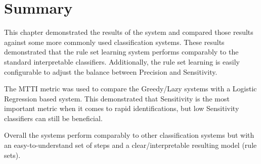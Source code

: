 \section{Summary}

This chapter demonstrated the results of the \Abb system and compared those results against some more commonly used classification systems. These results demonstrated that the \Abb rule set learning system performs comparably to the standard interpretable classifiers. Additionally, the \Abb rule set learning is easily configurable to adjust the balance between Precision and Sensitivity.

The MTTI metric was used to compare the Greedy/Lazy \Abb systems with a Logistic Regression based \Abb system. This demonstrated that Sensitivity is the most important metric when it comes to rapid identifications, but low Sensitivity classifiers can still be beneficial.

Overall the \Abb systems perform comparably to other classification systems but with an easy-to-understand set of steps and a clear/interpretable resulting model (rule sets). 